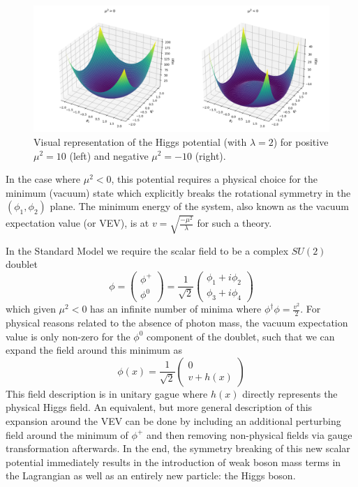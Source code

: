 \begin{figure}
\centering
    \includegraphics[width=1.0\textwidth]{images/Higgs_Potential.png}
    \caption{Visual representation of the Higgs potential (with $\lambda = 2$) for positive $\mu^2 = 10$ (left) and 
    negative $\mu^2 = -10$ (right).}
    \label{fig:Higgs Potential}
\end{figure}

In the case where $\mu^2 < 0$, this potential requires a physical choice for the minimum (vacuum) state which 
explicitly breaks the rotational symmetry in the $(\phi_1, \phi_2)$ plane. The minimum energy of the system, also 
known as the vacuum expectation value (or VEV), is at $v = \sqrt{\frac{-\mu^2}{\lambda}}$ for such a theory. \par

In the Standard Model we require the scalar field to be a complex $SU(2)$ doublet
\begin{equation}
\phi = 
\begin{pmatrix} \phi^+  \\ \phi^0 \end{pmatrix}
= \frac{1}{\sqrt{2}}
\begin{pmatrix} \phi_1 + i\phi_2 \\ \phi_3 + i\phi_4 \end{pmatrix}
\end{equation}
which given $\mu^2 < 0$ has an infinite number of minima where $\phi^\dagger\phi = \frac{v^2}{2}$. For physical 
reasons related to the absence of photon mass, the vacuum expectation value is only non-zero for the $\phi^0$ 
component of the doublet, such that we can expand the field around this minimum as
\begin{equation}
\phi(x) = \frac{1}{\sqrt{2}}
\begin{pmatrix} 0 \\ v + h(x) \end{pmatrix}
\end{equation}
This field description is in unitary gague where $h(x)$ directly represents the physical Higgs field. An equivalent, 
but more general description of this expansion around the VEV can be done by including an additional perturbing 
field around the minimum of $\phi^+$ and then removing non-physical fields via gauge transformation afterwards. 
In the end, the symmetry breaking of this new scalar potential immediately results in the introduction of weak
boson mass terms in the Lagrangian as well as an entirely new particle: the Higgs boson.

